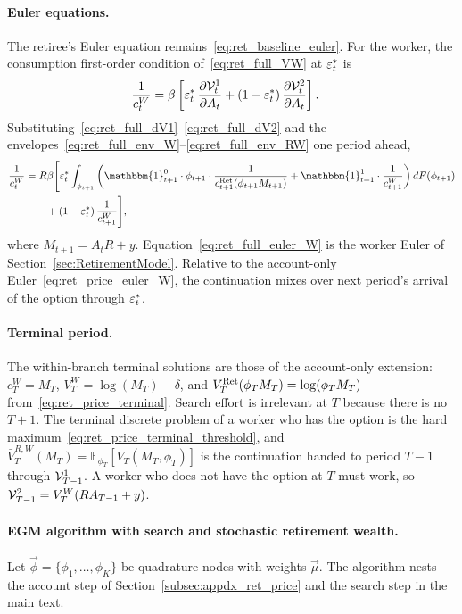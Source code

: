 \paragraph{Euler equations.}
The retiree's Euler equation remains~\eqref{eq:ret_baseline_euler}. For the worker, the consumption first-order condition of~\eqref{eq:ret_full_VW} at $\varepsilon_t^{\ast}$ is
\begin{align}
	\frac{1}{c_t^{W}}
	&= \beta\left[
		\varepsilon_t^{\ast}\,\frac{\partial\mathcal{V}_t^{1}}{\partial A_t}
		+(1-\varepsilon_t^{\ast})\,\frac{\partial\mathcal{V}_t^{2}}{\partial A_t}
	\right].
	\label{eq:ret_full_foc_c}
\end{align}
Substituting~\eqref{eq:ret_full_dV1}--\eqref{eq:ret_full_dV2} and the envelopes~\eqref{eq:ret_full_env_W}--\eqref{eq:ret_full_env_RW} one period ahead,
\begin{equation}
\begin{aligned}
	\frac{1}{c_t^{W}}
	&= R\beta\Bigg[
		\eff_t^{\ast}
		\int_{\phi_{t+1}}
		\left(
			\mathbbm{1}_{t+1}^{0}\cdot\phi_{t+1}\cdot\frac{1}{c_{t+1}^{\Ret}(\phi_{t+1} M_{t+1})}
			+\mathbbm{1}_{t+1}^{1}\cdot\frac{1}{c_{t+1}^{W}}
		\right)
		dF(\phi_{t+1})
		\\
		&\qquad
		+(1-\eff_t^{\ast})\,
		\frac{1}{c_{t+1}^{W}}
	\Bigg],
	\label{eq:ret_full_euler_W}
\end{aligned}
\end{equation}
where $M_{t+1}=A_t R+y$. Equation~\eqref{eq:ret_full_euler_W} is the worker Euler of Section~\ref{sec:RetirementModel}. Relative to the account-only Euler~\eqref{eq:ret_price_euler_W}, the continuation mixes over next period's arrival of the option through $\varepsilon_t^{\ast}$.

\paragraph{Terminal period.}
The within-branch terminal solutions are those of the account-only extension: $c_T^{W}=M_T$, $V_T^{W}=\log(M_T)-\delta$, and $V_T^{\mathrm{Ret}}(\phi_T M_T)=\log(\phi_T M_T)$ from~\eqref{eq:ret_price_terminal}. Search effort is irrelevant at $T$ because there is no $T+1$. The terminal discrete problem of a worker who has the option is the hard maximum~\eqref{eq:ret_price_terminal_threshold}, and $\bar V_T^{R,W}(M_T)=\mathbb{E}_{\phi_T}[V_T(M_T,\phi_T)]$ is the continuation handed to period $T-1$ through $\mathcal{V}_{T-1}^{1}$. A worker who does not have the option at $T$ must work, so $\mathcal{V}_{T-1}^{2}=V_T^{W}(R A_{T-1}+y)$.

\paragraph{EGM algorithm with search and stochastic retirement wealth.}
Let $\vec\phi=\{\phi_1,\dots,\phi_{K}\}$ be quadrature nodes with weights $\vec\mu$. The algorithm nests the account step of Section~\ref{subsec:appdx_ret_price} and the search step in the main text.

